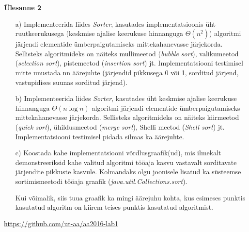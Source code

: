 \documentclass[a4paper]{article}
\begin{document}
\begin{problem}
\textbf{Ülesanne 2}

\begin{enumerate}
\item[a)]Implementeerida liides \textit{Sorter}, kasutades implementatsioonis üht ruutkeerukusega
(keskmise ajalise keerukuse hinnanguga $\Theta(n^2)$) algoritmi järjendi elementide
ümberpaigutamiseks mittekahanevasse järjekorda.  Sellisteks
algoritmideks on näiteks mullimeetod ({\it bubble sort}), valikumeetod
({\it selection sort}), pistemeetod ({\it insertion sort}) jt.
Implementatsiooni testimisel mitte unustada nn äärejuhte (järjendid pikkusega 0 või 1, sorditud järjend, vastupidises suunas sorditud
järjend).
\item[b)] Implementeerida liides \textit{Sorter}, kasutades üht keskmise ajalise
keerukuse hinnanguga  $ \Theta(n\log n)$ algoritmi järjendi elementide
ümberpaigutamiseks mittekahanevasse järjekorda. Sellisteks algoritmideks
on näiteks kiirmeetod ({\it quick sort}), ühildusmeetod ({\it merge
sort}), Shelli meetod ({\it Shell sort}) jt. Implementatsiooni testimisel pidada silmas ka äärejuhte.
\item[c)] Koostada kahe implementatsiooni võrdlusgraafik(ud), mis ilmekalt
demonstreeriksid kahe valitud algoritmi tööaja kasvu vastavalt sorditavate järjendite pikkuste kasvule. Kolmandaks olgu joonisele lisatud ka süsteemse sortimismeetodi tööaja graafik (\textit{java.util.Collections.sort}). 

Kui võimalik, siis tuua graafik ka mingi äärejuhu kohta, kus esimeses punktis kasutatud algoritm on kiirem teises punktis kasutatud algoritmist.
\end{enumerate}
\end{problem}

\url{https://github.com/ut-aa/aa2016-lab1}
\end{document}
